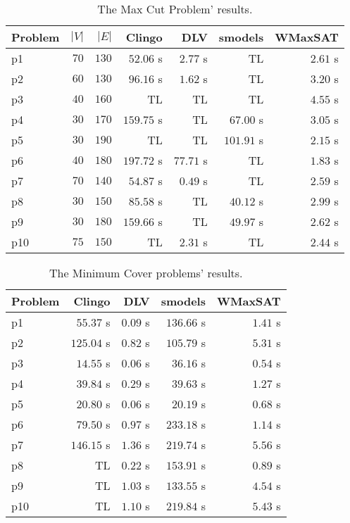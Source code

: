 \documentclass[]{article}
\begin{document}
\begin{table}[h]
\caption{The Max Cut Problem' results.}
\label{tab:max_cut_results}
\vspace{1em}
\scriptsize
\centering
\begin{tabular}{lrrrrrr}
\toprule
Problem & $ |V| $ & $ |E| $ & Clingo & DLV & smodels & WMaxSAT \\
\midrule
p1 & $ 70 $ & $ 130 $ & $ 52.06 $ s & $ 2.77 $ s & TL & $ \mathbf{2.61} $ s \\
p2 & $ 60 $ & $ 130 $ & $ 96.16 $ s & $ \mathbf{1.62} $ s & TL & $ 3.20 $ s \\
p3 & $ 40 $ & $ 160 $ & TL & TL & TL & $ \mathbf{4.55} $ s \\
p4 & $ 30 $ & $ 170 $ & $ 159.75 $ s & TL & $ 67.00 $ s & $ \mathbf{3.05} $ s \\
p5 & $ 30 $ & $ 190 $ & TL & TL & $ 101.91 $ s & $ \mathbf{2.15} $ s \\
p6 & $ 40 $ & $ 180 $ & $ 197.72 $ s & $ 77.71 $ s & TL & $ \mathbf{1.83} $ s \\
p7 & $ 70 $ & $ 140 $ & $ 54.87 $ s & $ \mathbf{0.49} $ s & TL & $ 2.59 $ s \\
p8 & $ 30 $ & $ 150 $ & $ 85.58 $ s & TL & $ 40.12 $ s & $ \mathbf{2.99} $ s \\
p9 & $ 30 $ & $ 180 $ & $ 159.66 $ s & TL & $ 49.97 $ s & $ \mathbf{2.62} $ s \\
p10 & $ 75 $ & $ 150 $ & TL & $ \mathbf{2.31} $ s & TL & $ 2.44 $ s \\
\bottomrule
\end{tabular}
\end{table}

\begin{table}[h]
\caption{The Minimum Cover problems' results.}
\label{tab:minimum_cover_results}
\vspace{1em}
\scriptsize
\centering
\begin{tabular}{lrrrr}
\toprule
Problem & Clingo & DLV & smodels & WMaxSAT \\
\midrule
p1 & $ 55.37 $ s & $ \mathbf{0.09} $ s & $ 136.66 $ s & $ 1.41 $ s \\
p2 & $ 125.04 $ s & $ \mathbf{0.82} $ s & $ 105.79 $ s & $ 5.31 $ s \\
p3 & $ 14.55 $ s & $ \mathbf{0.06} $ s & $ 36.16 $ s & $ 0.54 $ s \\
p4 & $ 39.84 $ s & $ \mathbf{0.29} $ s & $ 39.63 $ s & $ 1.27 $ s \\
p5 & $ 20.80 $ s & $ \mathbf{0.06} $ s & $ 20.19 $ s & $ 0.68 $ s \\
p6 & $ 79.50 $ s & $ \mathbf{0.97} $ s & $ 233.18 $ s & $ 1.14 $ s \\
p7 & $ 146.15 $ s & $ \mathbf{1.36} $ s & $ 219.74 $ s & $ 5.56 $ s \\
p8 & TL & $ \mathbf{0.22} $ s & $ 153.91 $ s & $ 0.89 $ s \\
p9 & TL & $ \mathbf{1.03} $ s & $ 133.55 $ s & $ 4.54 $ s \\
p10 & TL & $ \mathbf{1.10} $ s & $ 219.84 $ s & $ 5.43 $ s \\
\bottomrule
\end{tabular}
\end{table}
\end{document}

